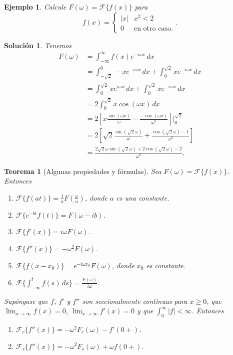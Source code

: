 \documentclass[11pt,letterpaper]{report}
\newtheorem{theorem}[defn]{Teorema}
\newtheorem{example}[defn]{Ejemplo}
\newtheorem*{sol}{Solución}
\newcommand\<{\langle}
\renewcommand\>{\rangle}
\let\cal\mathcal
\begin{document}
\begin{example}
  Calcule $F(\omega)=\cal F\{f(x)\}$ para
  \[
    f(x)
    =
    \begin{cases}
      |x| & x^{2}<2 \\
      0 & \text{en otro caso.}
    \end{cases}
  .\]
\end{example}
\begin{sol}
  Tenemos
  \begin{align*}
    F(\omega)
    &= \int_{-\infty}^{\infty}f(x)e^{-i\omega x}\,dx \\
    &= \int_{-\sqrt 2}^{0}-xe^{-i\omega x}\,dx
      + \int_{0}^{\sqrt 2}xe^{-i\omega x}\,dx \\
    &= \int_{0}^{\sqrt 2}xe^{i\omega x}\,dx
      + \int_{0}^{\sqrt 2}xe^{-i\omega x}\,dx \\
    &= 2\int_{0}^{\sqrt 2}x\cos(\omega x)\,dx \\
    &= 2\left[
      x\frac{\sin(\omega x)}{\omega}-\frac{-\cos(\omega
      x)}{\omega^{2}}
    \right]\Big|_{0}^{\sqrt 2} \\
    &= 2\left[
      \sqrt 2\frac{\sin(\sqrt 2\omega)}{\omega}
      +\frac{\cos(\sqrt 2\omega)-1}{\omega^{2}}
    \right] \\
    &=
      \frac{2\sqrt 2\omega\sin(\sqrt 2\omega)+2\cos(\sqrt 2\omega)-2}
      {\omega^{2}}.
  \end{align*}
\end{sol}

\begin{theorem}[Algunas propiedades y fórmulas]
  Sea $F(\omega)=\cal F\{f(x)\}$.
  Entonces
  \begin{enumerate}
    \item $\cal F\{f(at)\}=\frac{1}{a}F(\frac{\omega}{a})$, donde $a$
      es una constante.
    \item $\cal F\{e^{-bt}f(t)\}=F(\omega-ib)$.
    \item $\cal F\{f'(x)\}=i\omega F(\omega)$.
    \item $\cal F\{f''(x)\}=-\omega^{2}F(\omega)$.
    \item $\cal F\{f(x-x_0)\}=e^{-i\omega x_0}F(\omega)$, donde $x_0$
      es constante.
    \item $\cal
      F\{\int_{-\infty}^{t}f(s)\,ds\}=\frac{F(\omega)}{i\omega}$.
  \end{enumerate}
  Supóngase que $f$, $f'$ y $f''$ son seccionalmente continuas para
  $x\geq 0$, que $\lim_{x\to\infty}f(x)=0$,
  $\lim_{x\to\infty}f'(x)=0$ y que $\int_{0}^{\infty}|f|<\infty$.
  Entonces
  \begin{enumerate}
    \item $\cal F_c\{f''(x)\}=-\omega^{2}F_c(\omega)-f'(0+)$.
    \item $\cal F_s\{f''(x)\}=-\omega^{2}F_s(\omega)+\omega f(0+)$.
  \end{enumerate}
\end{theorem}
\end{document}
